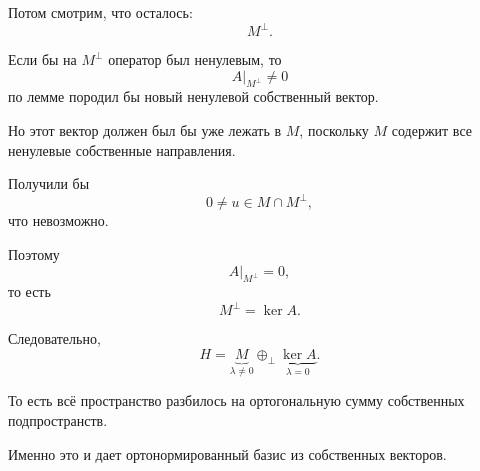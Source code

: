 \begin{idea}
	Потом смотрим, что осталось:
	\[
	M^\perp.
	\]
	
	Если бы на \(M^\perp\) оператор был ненулевым, то
	\[
	A|_{M^\perp}\neq0
	\]
	по лемме породил бы новый ненулевой собственный вектор.
	
	Но этот вектор должен был бы уже лежать в \(M\), поскольку
	\(M\) содержит все ненулевые собственные направления.
	
	Получили бы
	\[
	0\neq u\in M\cap M^\perp,
	\]
	что невозможно.
	
	Поэтому
	\[
	A|_{M^\perp}=0,
	\]
	то есть
	\[
	M^\perp=\ker A.
	\]
	
	Следовательно,
	\[
	\boxed{
		H=
		\underbrace{M}_{\lambda\neq0}
		\oplus_\perp
		\underbrace{\ker A}_{\lambda=0}.
	}
	\]
	
	То есть всё пространство разбилось на ортогональную сумму собственных
	подпространств.
	
	Именно это и дает ортонормированный базис из собственных векторов.
\end{idea}